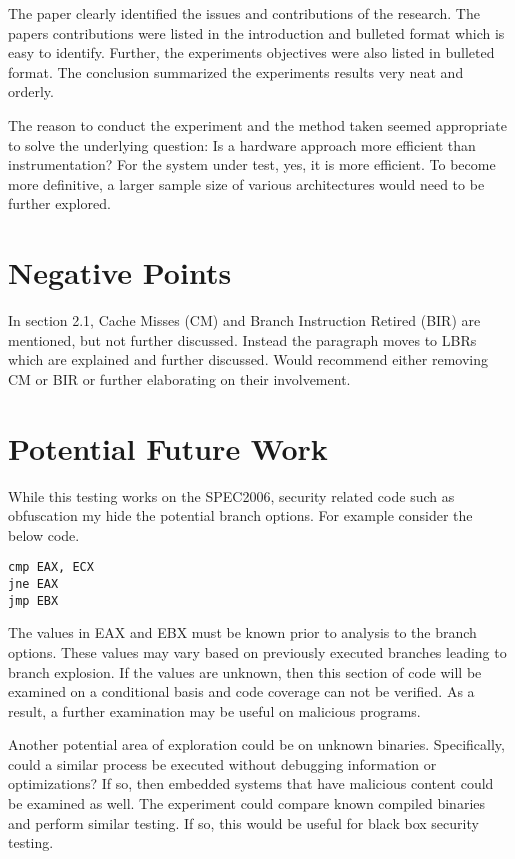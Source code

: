 \documentclass[conference]{IEEEtran}
\begin{document}
The paper clearly identified the issues and contributions of the research. The papers contributions were listed in the introduction and bulleted format which is easy to identify. Further, the experiments objectives were also listed in bulleted format. The conclusion summarized the experiments results very neat and orderly.

The reason to conduct the experiment and the method taken seemed appropriate to solve the underlying question: Is a hardware approach more efficient than instrumentation? For the system under test, yes, it is more efficient. To become more definitive, a larger sample size of various architectures would need to be further explored.

\section{Negative Points}

In section 2.1, Cache Misses (CM) and Branch Instruction Retired (BIR) are mentioned, but not further discussed. Instead the paragraph moves to LBRs which are explained and further discussed. Would recommend either removing CM or BIR or further elaborating on their involvement.

 
\section{Potential Future Work}
While this testing works on the SPEC2006, security related code such as obfuscation my hide the potential branch options. For example consider the below code.
\begin{lstlisting}
cmp EAX, ECX
jne EAX
jmp EBX
\end{lstlisting}
The values in EAX and EBX must be known prior to analysis to the branch options. These values may vary based on previously executed branches leading to branch explosion. If the values are unknown, then this section of code will be examined on a conditional basis and code coverage can not be verified. 
As a result, a further examination may be useful on malicious programs.

Another potential area of exploration could be on unknown binaries. Specifically, could a similar process be executed without debugging information or optimizations? If so, then embedded systems that have malicious content could be examined as well. The experiment could compare known compiled binaries and perform similar testing. If so, this would be useful for black box security testing.
%
%


\end{document}
